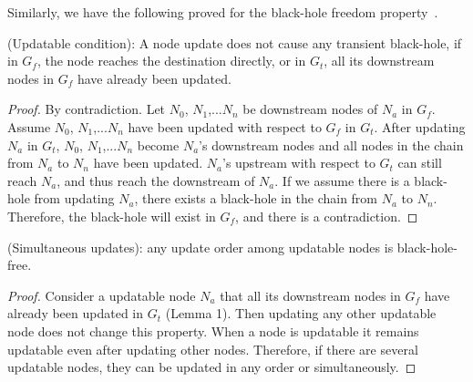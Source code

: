 

Similarly, we have the following proved for the black-hole freedom property~\cite{gcc_tr}.

  \vspace{-0.1in}
\begin{lemma} (Updatable condition):
A node update does not cause any transient black-hole,
if in $G_f$, the node reaches the destination directly, or
in $G_t$, all its downstream nodes in $G_f$ have already been updated.
\end{lemma}
  \vspace{-0.1in}

  \vspace{-0.1in}
\begin{proof} By contradiction. Let $N_0$, $N_1$,...$N_n$ be downstream
nodes of $N_a$ in $G_f$. Assume $N_0$, $N_1$,...$N_n$ 
have been updated with respect to $G_f$ in $G_t$.
After updating $N_a$ in $G_t$, $N_0$, $N_1$,...$N_n$ become $N_a$'s
downstream nodes and
all nodes in the chain from $N_a$ to $N_n$ have been updated. %
 $N_a$'s upstream with respect to $G_t$ can still reach $N_a$, and thus reach the downstream of $N_a$.
If we assume there is a black-hole from updating $N_a$,
there exists a black-hole in the chain from $N_a$ to $N_n$.
Therefore, the black-hole will exist in 
$G_f$, and there is a contradiction.
\end{proof}
  \vspace{-0.1in}


  \vspace{-0.1in}
\begin{lemma} (Simultaneous updates):  any update order among updatable nodes is black-hole-free.  
\end{lemma}
  \vspace{-0.1in}

  \vspace{-0.1in}
\begin{proof} Consider a updatable node $N_a$  that all its downstream nodes in
$G_f$ have already been updated in $G_t$ (Lemma 1). 
Then updating any other updatable node does not change this
property. When a node is updatable it remains updatable even after updating
other nodes. Therefore, if there are several updatable nodes, they can be
updated in any order or simultaneously.  
\end{proof}
  \vspace{-0.1in}

